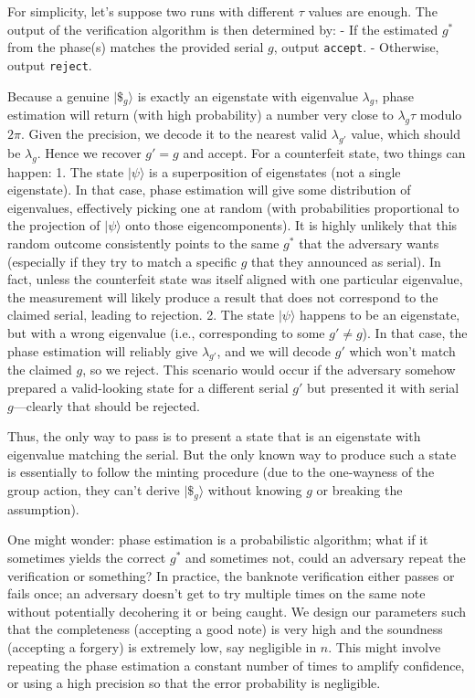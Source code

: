 \documentclass[11pt]{article}
\theoremstyle{definition}
\begin{document}
    For simplicity, let’s suppose two runs with different $\tau$ values are enough. The output of the verification algorithm is then determined by:
    - If the estimated $g^*$ from the phase(s) matches the provided serial $g$, output \texttt{accept}.
    - Otherwise, output \texttt{reject}.

    Because a genuine $|\$_g\rangle$ is exactly an eigenstate with eigenvalue $\lambda_g$, phase estimation will return (with high probability) a number very close to $\lambda_g \tau$ modulo $2\pi$. Given the precision, we decode it to the nearest valid $\lambda_{g'}$ value, which should be $\lambda_g$. Hence we recover $g'=g$ and accept. For a counterfeit state, two things can happen:
    1. The state $|\psi\rangle$ is a superposition of eigenstates (not a single eigenstate). In that case, phase estimation will give some distribution of eigenvalues, effectively picking one at random (with probabilities proportional to the projection of $|\psi\rangle$ onto those eigencomponents). It is highly unlikely that this random outcome consistently points to the same $g^*$ that the adversary wants (especially if they try to match a specific $g$ that they announced as serial). In fact, unless the counterfeit state was itself aligned with one particular eigenvalue, the measurement will likely produce a result that does not correspond to the claimed serial, leading to rejection.
    2. The state $|\psi\rangle$ happens to be an eigenstate, but with a wrong eigenvalue (i.e., corresponding to some $g' \neq g$). In that case, the phase estimation will reliably give $\lambda_{g'}$, and we will decode $g'$ which won’t match the claimed $g$, so we reject. This scenario would occur if the adversary somehow prepared a valid-looking state for a different serial $g'$ but presented it with serial $g$—clearly that should be rejected.

    Thus, the only way to pass is to present a state that is an eigenstate with eigenvalue matching the serial. But the only known way to produce such a state is essentially to follow the minting procedure (due to the one-wayness of the group action, they can’t derive $|\$_g\rangle$ without knowing $g$ or breaking the assumption).

    One might wonder: phase estimation is a probabilistic algorithm; what if it sometimes yields the correct $g^*$ and sometimes not, could an adversary repeat the verification or something? In practice, the banknote verification either passes or fails once; an adversary doesn’t get to try multiple times on the same note without potentially decohering it or being caught. We design our parameters such that the completeness (accepting a good note) is very high and the soundness (accepting a forgery) is extremely low, say negligible in $n$. This might involve repeating the phase estimation a constant number of times to amplify confidence, or using a high precision so that the error probability is negligible.
\end{document}
